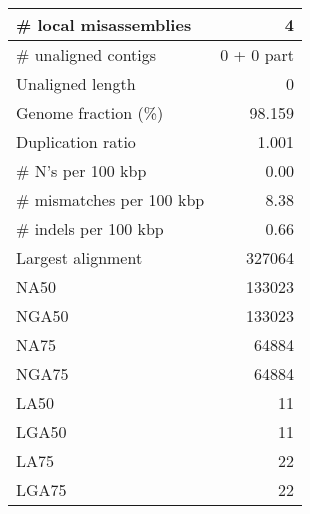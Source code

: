\documentclass[12pt,a4paper]{article}
\begin{document}
\begin{table}[ht]
\begin{center}
\begin{tabular}{|l*{1}{|r}|}
\# local misassemblies & 4 \\ \hline
\# unaligned contigs & 0 + 0 part \\ \hline
Unaligned length & 0 \\ \hline
Genome fraction (\%) & 98.159 \\ \hline
Duplication ratio & 1.001 \\ \hline
\# N's per 100 kbp & 0.00 \\ \hline
\# mismatches per 100 kbp & 8.38 \\ \hline
\# indels per 100 kbp & 0.66 \\ \hline
Largest alignment & 327064 \\ \hline
NA50 & 133023 \\ \hline
NGA50 & 133023 \\ \hline
NA75 & 64884 \\ \hline
NGA75 & 64884 \\ \hline
LA50 & 11 \\ \hline
LGA50 & 11 \\ \hline
LA75 & 22 \\ \hline
LGA75 & 22 \\ \hline
\end{tabular}
\end{center}
\end{table}
\end{document}
